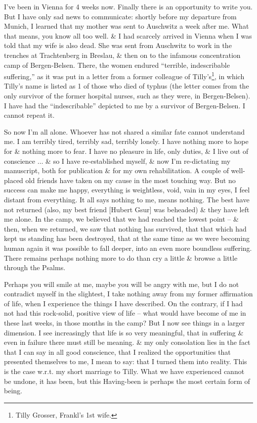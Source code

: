 \documentclass{article}
\numberwithin{equation}{section}
\begin{document}
I've been in Vienna for 4 weeks now. Finally there is an opportunity to write you. But I have only sad news to communicate: shortly before my departure from Munich, I learned that my mother was sent to Auschwitz a week after me. What that means, you know all too well. \& I had scarcely arrived in Vienna when I was told that my wife is also dead. She was sent from Auschwitz to work in the trenches at Trachtenberg in Breslau, \& then on to the infamous concentration camp of Bergen-Belsen. There, the women endured ``terrible, indescribable suffering,'' as it was put in a letter from a former colleague of Tilly's\footnote{Tilly Grosser, Frankl's 1st wife.}, in which Tilly's name is listed as 1 of those who died of typhus (the letter comes from the only survivor of the former hospital nurses, such as they were, in Bergen-Belsen). I have had the ``indescribable'' depicted to me by a survivor of Bergen-Belsen. I cannot repeat it.

So now I'm all alone. Whoever has not shared a similar fate cannot understand me. I am terribly tired, terribly sad, terribly lonely. I have nothing more to hope for \& nothing more to fear. I have no pleasure in life, only duties, \& I live out of conscience $\ldots$ \& so I have re-established myself, \& now I'm re-dictating my manuscript, both for publication \& for my own rehabilitation. A couple of well-placed old friends have taken on my cause in the most touching way. But no success can make me happy, everything is weightless, void, vain in my eyes, I feel distant from everything. It all says nothing to me, means nothing. The best have not returned (also, my best friend [Hubert Gsur] was beheaded) \& they have left me alone. In the camp, we believed that we had reached the lowest point -- \& then, when we returned, we saw that nothing has survived, that that which had kept us standing has been destroyed, that at the same time as we were becoming human again it was possible to fall deeper, into an even more boundless suffering. There remains perhaps nothing more to do than cry a little \& browse a little through the Psalms.

Perhaps you will smile at me, maybe you will be angry with me, but I do not contradict myself in the slightest, I take nothing away from my former affirmation of life, when I experience the things I have described. On the contrary, if I had not had this rock-solid, positive view of life -- what would have become of me in these last weeks, in those months in the camp? But I now see things in a larger dimension. I see increasingly that life is so very meaningful, that in suffering \& even in failure there must still be meaning. \& my only consolation lies in the fact that I can say in all good conscience, that I realized the opportunities that presented themselves to me, I mean to say: that I turned them into reality. This is the case w.r.t. my short marriage to Tilly. What we have experienced cannot be undone, it has been, but this Having-been is perhaps the most certain form of being.
\end{document}
